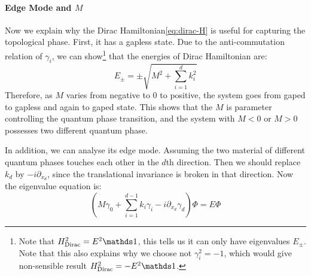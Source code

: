 \documentclass{article}
\begin{document}
\paragraph{Edge Mode and \texorpdfstring{$M$}{}}
Now we explain why the Dirac Hamiltonian\ref{eq:dirac-H}  is useful for capturing the topological
phase. First, it has a gapless state. Due to the anti-commutation relation of
$\gamma_i$, we can show\footnote{Note that $H_\text{Dirac}^2= E^2\id$, this
tells us it can only have eigenvalues $E_\pm$. Note that this also explains why
we choose not $\gamma_i^2=-1$, which would give non-sensible result
$H_\text{Dirac}^2= -E^2\id$.}
that the energies of Dirac Hamiltonian are:
\begin{equation}
    E_\pm = \pm\sqrt{M^2+\sum_{i=1}^d k^2_i}
\end{equation}
Therefore, as $M$ varies from negative to $0$ to positive, the system goes from
gaped to gapless and again to gaped state. This shows that the $M$ is parameter
controlling the quantum phase transition, and the system with $M<0$ or $M>0$
possesses two different quantum phase.

In addition, we can analyse its edge mode. Assuming the two material of
different quantum phases touches each other in the $d$th direction. Then we
should replace $k_d$ by $-i\partial_{x_d}$, since the translational invariance is
broken in that direction. Now the eigenvalue equation is:
\begin{equation}
    ( M\gamma_0 + \sum_{i=1}^{d-1} k_i\gamma_i - i\partial_{x_d}\gamma_d ) \Phi
    = E \Phi
\end{equation}
\end{document}
